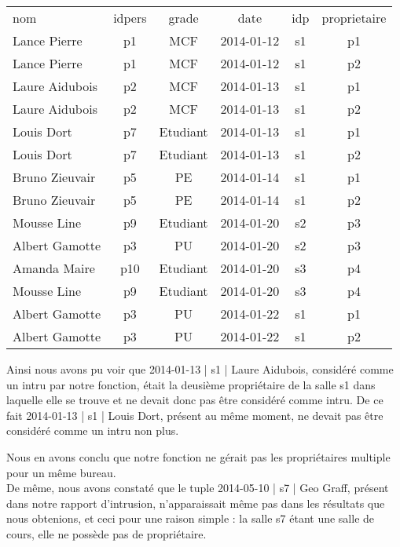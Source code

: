 \begin{center}
	\begin{tabular}
		{| l |	c |	c | c | c | c |} \hline
		nom       & idpers &  grade   &    date    & idp & proprietaire \\ \hlineGras
		 Lance Pierre   & p1      & MCF      & 2014-01-12 & s1  & p1 \\ \hline
		 Lance Pierre   & p1     & MCF      & 2014-01-12 & s1  & p2 \\ \hline
		 Laure Aidubois & p2     & MCF      & 2014-01-13 & s1  & p1 \\ \hline 
		 Laure Aidubois & p2     & MCF      & 2014-01-13 & s1  & p2 \\ \hline
		 Louis Dort     & p7     & Etudiant & 2014-01-13 & s1  & p1 \\ \hline
		 Louis Dort     & p7     & Etudiant & 2014-01-13 & s1  & p2 \\ \hline
		 Bruno Zieuvair & p5     & PE       & 2014-01-14 & s1  & p1 \\ \hline
		 Bruno Zieuvair & p5     & PE       & 2014-01-14 & s1  & p2 \\ \hline
		 Mousse Line    & p9     & Etudiant & 2014-01-20 & s2  & p3 \\ \hline
		 Albert Gamotte & p3     & PU       & 2014-01-20 & s2  & p3 \\ \hline
		 Amanda Maire   & p10    & Etudiant & 2014-01-20 & s3  & p4 \\ \hline
		 Mousse Line    & p9     & Etudiant & 2014-01-20 & s3  & p4 \\ \hline
		 Albert Gamotte & p3     & PU       & 2014-01-22 & s1  & p1 \\ \hline
		 Albert Gamotte & p3     & PU       & 2014-01-22 & s1  & p2 \\ \hline
	\end{tabular}
\end{center}


Ainsi nous avons pu voir que 2014-01-13 | s1    | Laure Aidubois, considéré comme un intru par notre fonction, était la deusième propriétaire de la salle s1 dans laquelle elle se trouve et ne devait donc pas être considéré comme intru. De ce fait 	 2014-01-13 | s1    | Louis Dort, présent au même moment, ne devait pas être considéré comme un intru non plus.

Nous en avons conclu que notre fonction ne gérait pas les propriétaires multiple pour un même bureau.\\

De même, nous avons constaté que le tuple 2014-05-10 | s7    | Geo Graff, présent dans notre rapport d'intrusion, n'apparaissait même pas dans les résultats que nous obtenions, et ceci pour une raison simple : la salle s7 étant une salle de cours, elle ne possède pas de propriétaire.

